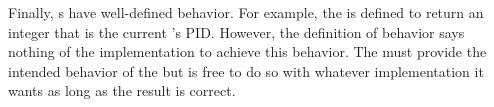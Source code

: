 Finally, s have well-defined behavior.
For example, the   is defined to return an integer that is the current ’s PID.\@
However, the definition of behavior says nothing of the implementation to achieve this behavior.
The  must provide the intended behavior of the  but is free to do so with whatever implementation it wants as long as the result is correct.











